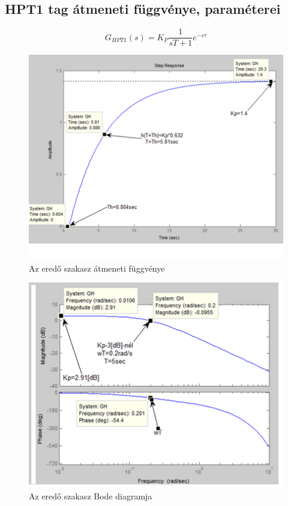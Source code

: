 \documentclass[11pt,a4paper]{article}
\begin{document}
\subsection{HPT1 tag átmeneti függvénye, paraméterei}
$$G_{HPT1}\left(s\right)=K_P\frac{1}{sT + 1}e^{-s\tau}$$
\begin{figure}[hbtp]
    	 \centering
		\includegraphics[scale=0.8]{41_hpt1_atmeneti.png}
		\caption{Az eredő szakasz átmeneti függvénye}
\end{figure}
\begin{figure}[hbtp]
    	 \centering
		\includegraphics[scale=0.8]{42_hpt1_bode.png}
		\caption{Az eredő szakasz Bode diagramja}
\end{figure}
\end{document}
